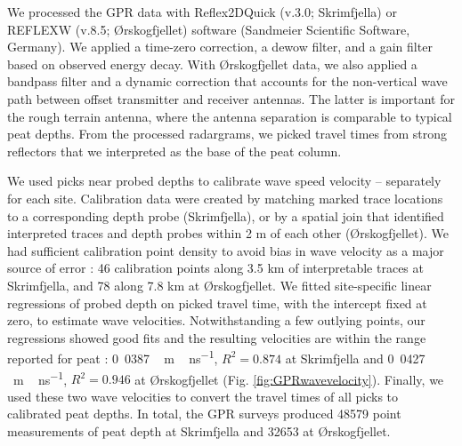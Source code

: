 \documentclass[soil, manuscript]{copernicus}
\begin{document}
We processed the GPR data with Reflex2DQuick (v.3.0; Skrimfjella) or REFLEXW (v.8.5; Ørskogfjellet) software (Sandmeier Scientific Software, Germany).
We applied a time-zero correction, a dewow filter, and a gain filter based on observed energy decay.
With Ørskogfjellet data, we also applied a bandpass filter and a dynamic correction that accounts for the non-vertical wave path between offset transmitter and receiver antennas.
The latter is important for the rough terrain antenna, where the antenna separation is comparable to typical peat depths.
From the processed radargrams, we picked travel times from strong reflectors that we interpreted as the base of the peat column.

We used picks near probed depths to calibrate wave speed velocity -- separately for each site.
Calibration data were created by matching marked trace locations to a corresponding depth probe (Skrimfjella), or by a spatial join that identified interpreted traces and depth probes within 2 m of each other (Ørskogfjellet).
We had sufficient calibration point density to avoid bias in wave velocity as a major source of error \citep{rosaDeterminingNumberManual2009}: 46 calibration points along 3.5 km of interpretable traces at Skrimfjella, and 78 along 7.8 km at Ørskogfjellet.
We fitted site-specific linear regressions of probed depth on picked travel time, with the intercept fixed at zero, to estimate wave velocities.
Notwithstanding a few outlying points, our regressions showed good fits and the resulting velocities are within the range reported for peat \citep{parsekianUncertaintyPeatVolume2012}: \unit{0.0387\,m\,ns^{-1}}, \(R^2 = 0.874\) at Skrimfjella and \unit{0.0427\,m\,ns^{-1}}, \(R^2 = 0.946\) at Ørskogfjellet (Fig. \ref{fig:GPRwavevelocity}).
Finally, we used these two wave velocities to convert the travel times of all picks to calibrated peat depths.
In total, the GPR surveys produced 48579 point measurements of peat depth at Skrimfjella and 32653 at Ørskogfjellet.
\end{document}

